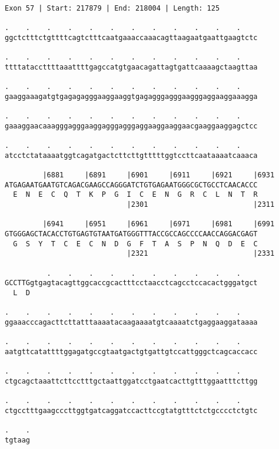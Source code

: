 \documentclass{article}
\begin{document}
\begin{Verbatim}
Exon 57 | Start: 217879 | End: 218004 | Length: 125
 
.    .    .    .    .    .    .    .    .    .    .    .    
ggctctttctgttttcagtctttcaatgaaaccaaacagttaagaatgaattgaagtctc
  
.    .    .    .    .    .    .    .    .    .    .    .    
ttttataccttttaaattttgagccatgtgaacagattagtgattcaaaagctaagttaa
  
.    .    .    .    .    .    .    .    .    .    .    .    
gaaggaaagatgtgagagagggaaggaaggtgagagggagggaagggaggaaggaaagga
  
.    .    .    .    .    .    .    .    .    .    .    .    
gaaaggaacaaagggagggaaggagggagggaggaaggaaggaacgaaggaaggagctcc
  
.    .    .    .    .    .    .    .    .    .    .    .    
atcctctataaaatggtcagatgactcttcttgtttttggtccttcaataaaatcaaaca
  
         |6881     |6891     |6901     |6911     |6921     |6931
ATGAGAATGAATGTCAGACGAAGCCAGGGATCTGTGAGAATGGGCGCTGCCTCAACACCC
  E  N  E  C  Q  T  K  P  G  I  C  E  N  G  R  C  L  N  T  R
                             |2301                         |2311
  
         |6941     |6951     |6961     |6971     |6981     |6991
GTGGGAGCTACACCTGTGAGTGTAATGATGGGTTTACCGCCAGCCCCAACCAGGACGAGT
  G  S  Y  T  C  E  C  N  D  G  F  T  A  S  P  N  Q  D  E  C
                             |2321                         |2331
  
          .    .    .    .    .    .    .    .    .    .    
GCCTTGgtgagtacagttggcaccgcactttcctaacctcagcctccacactgggatgct
  L  D                                                      
  
.    .    .    .    .    .    .    .    .    .    .    .    
ggaaacccagacttcttatttaaaatacaagaaaatgtcaaaatctgaggaaggataaaa
  
.    .    .    .    .    .    .    .    .    .    .    .    
aatgttcatattttggagatgccgtaatgactgtgattgtccattgggctcagcaccacc
  
.    .    .    .    .    .    .    .    .    .    .    .    
ctgcagctaaattcttcctttgctaattggatcctgaatcacttgtttggaatttcttgg
  
.    .    .    .    .    .    .    .    .    .    .    .    
ctgcctttgaagcccttggtgatcaggatccacttccgtatgtttctctgcccctctgtc
  
.    .
tgtaag
\end{Verbatim}
\newpage
\end{document}
